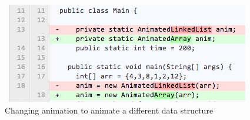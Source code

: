 \begin{figure}
\begin{center}
\includegraphics[width=\textwidth]{images/changeStructure.png}
\end{center}
\caption{Changing animation to animate a different data structure}
\label{fig:changeStructure}
\end{figure}